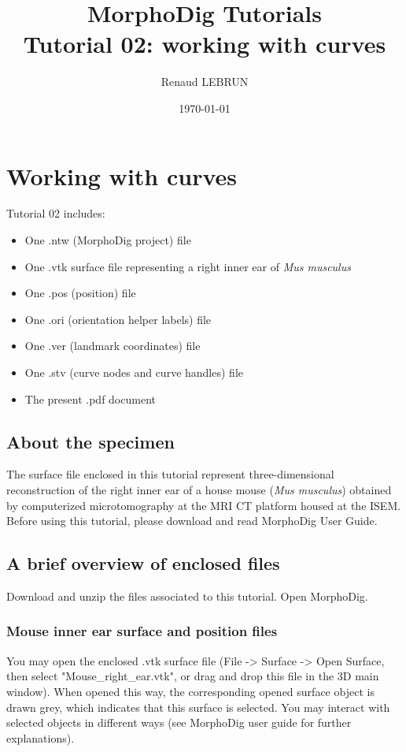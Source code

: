 \documentclass[12pt, a4paper]{book}
\title{MorphoDig Tutorials\\Tutorial 02: working with curves}
\author{Renaud LEBRUN}
\affil{Institut des Sciences de l'Evolution, Université de Montpellier, France}
\date{\today}
\begin{document}
\dominitoc	

\maketitle


\tableofcontents

\chapter{Working with curves}


\minitoc 
Tutorial 02 includes:
\begin{itemize}
\item One .ntw (MorphoDig project) file
\item One .vtk surface file representing a right inner ear of \textit{Mus musculus}
\item One .pos (position) file 
\item One .ori (orientation helper labels) file 
\item One .ver (landmark coordinates) file
\item One .stv (curve nodes and curve handles) file
\item The present .pdf document
\end{itemize}





\section{About the specimen}

The surface file enclosed in this tutorial represent three-dimensional reconstruction of the right inner ear of a house mouse (\textit{Mus musculus}) obtained by computerized microtomography at the MRI \si{\micro} CT platform housed at the ISEM.\\
Before using this tutorial, please download and read MorphoDig User Guide.


\section{A brief overview of enclosed files}
		Download and unzip the files associated to this tutorial. Open MorphoDig.
\subsection{Mouse inner ear surface and position files}
	You may open the enclosed .vtk surface file (File -> Surface -> Open Surface, then select "Mouse\_right\_ear.vtk", or drag and drop this file in the 3D main window). When opened
this way, the corresponding opened surface object is drawn grey, which indicates that this surface
is selected. You may interact with selected objects in different ways (see MorphoDig user guide for
further explanations).\\
\end{document}
